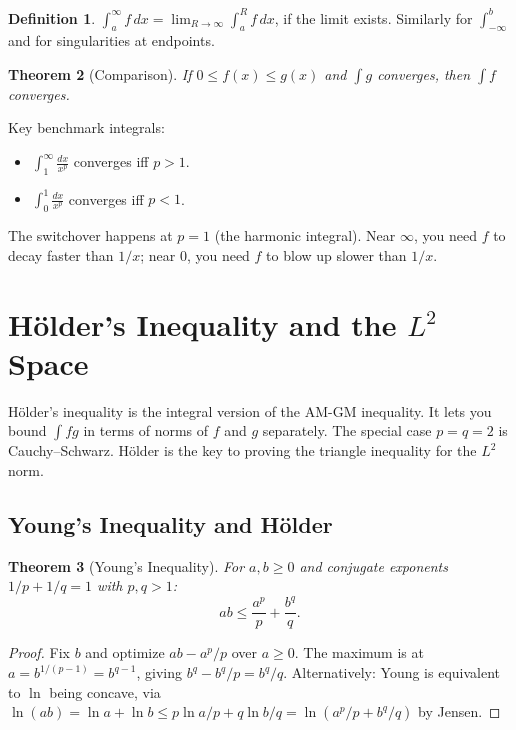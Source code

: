 \documentclass[11pt]{article}
\theoremstyle{myplain}
\newtheorem{theorem}{Theorem}[section]
\theoremstyle{definition}
\newtheorem{definition}[theorem]{Definition}
\theoremstyle{remark}
\begin{document}
\begin{definition}
$\displaystyle\int_a^\infty f\,dx = \lim_{R\to\infty}\int_a^R f\,dx$, if the limit exists. Similarly for $\int_{-\infty}^b$ and for singularities at endpoints.
\end{definition}

\begin{theorem}[Comparison]
If $0 \leq f(x) \leq g(x)$ and $\int g$ converges, then $\int f$ converges.
\end{theorem}

\begin{insight}
Key benchmark integrals:
\begin{itemize}
  \item $\displaystyle\int_1^\infty \frac{dx}{x^p}$ converges iff $p > 1$.
  \item $\displaystyle\int_0^1 \frac{dx}{x^p}$ converges iff $p < 1$.
\end{itemize}
The switchover happens at $p = 1$ (the harmonic integral). Near $\infty$, you need $f$ to decay faster than $1/x$; near $0$, you need $f$ to blow up slower than $1/x$.
\end{insight}

\section{H\"{o}lder's Inequality and the $L^2$ Space}

\begin{bigpicture}
Hölder's inequality is the integral version of the AM-GM inequality. It lets you bound $\int fg$ in terms of norms of $f$ and $g$ separately. The special case $p = q = 2$ is Cauchy--Schwarz. Hölder is the key to proving the triangle inequality for the $L^2$ norm.
\end{bigpicture}

\subsection{Young's Inequality and Hölder}

\begin{theorem}[Young's Inequality]
For $a, b \geq 0$ and conjugate exponents $1/p + 1/q = 1$ with $p, q > 1$:
$$ab \leq \frac{a^p}{p} + \frac{b^q}{q}.$$
\end{theorem}

\begin{proof}
Fix $b$ and optimize $ab - a^p/p$ over $a \geq 0$. The maximum is at $a = b^{1/(p-1)} = b^{q-1}$, giving $b^q - b^q/p = b^q/q$. Alternatively: Young is equivalent to $\ln$ being concave, via $\ln(ab) = \ln a + \ln b \leq p\ln a/p + q\ln b/q = \ln(a^p/p + b^q/q)$ by Jensen.
\end{proof}
\end{document}
